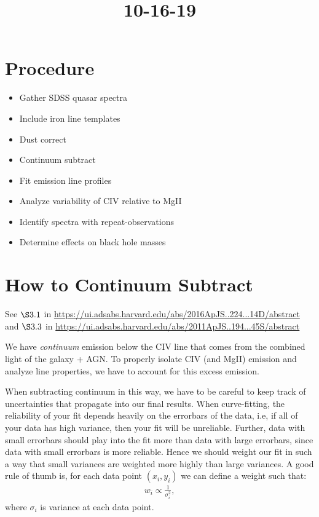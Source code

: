 \documentclass[12pt]{article}
\begin{document}
\title{10-16-19}
\author{}
\maketitle
    \section{Procedure}
        \begin{itemize}
            \item Gather SDSS quasar spectra
            \item Include iron line templates
            \item Dust correct
            \item Continuum subtract
            \item Fit emission line profiles
            \item Analyze variability of CIV relative to MgII
            \item Identify spectra with repeat-observations
            \item Determine effects on black hole masses
        \end{itemize}

    \section{How to Continuum Subtract}
        See $\S3.1$ in \url{https://ui.adsabs.harvard.edu/abs/2016ApJS..224...14D/abstract}
        and $\S3.3$ in \url{https://ui.adsabs.harvard.edu/abs/2011ApJS..194...45S/abstract}

        We have \textit{continuum} emission below the CIV line that comes from the combined light of the galaxy + AGN.
        To properly isolate CIV (and MgII) emission and analyze line properties, we have to account for this excess emission.

        When subtracting continuum in this way, we have to be careful to keep track of uncertainties that propagate into our final results.
        When curve-fitting, the reliability of your fit depends heavily on the errorbars of the data, i.e, if all of your data has high variance, then your fit will be unreliable.
        Further, data with small errorbars should play into the fit more than data with large errorbars, since data with small errorbars is more reliable.
        Hence we should weight our fit in such a way that small variances are weighted more highly than large variances.
        A good rule of thumb is, for each data point $(x_i, y_i)$ we can define a weight such that:
        \begin{align}
            w_i \propto \frac{1}{\sigma_i^2},
        \end{align}
        where $\sigma_i$ is variance at each data point.
\end{document}
